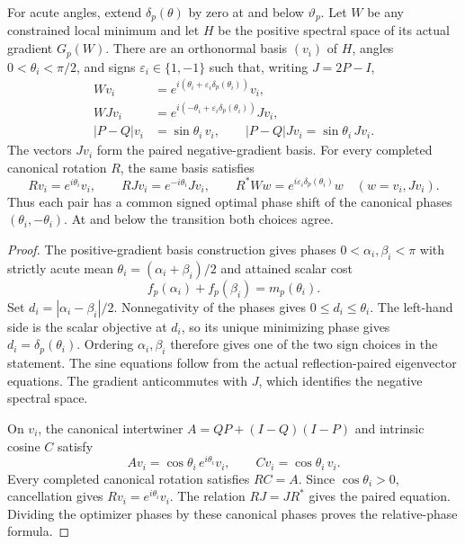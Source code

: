 \begin{proposition}
\label{prop:schatten-all-signed-phases}
For acute angles, extend $\delta_p(\theta)$ by zero at and below
$\vartheta_p$. Let $W$ be any constrained local minimum and let
$H$ be the positive spectral space of its actual gradient $G_p(W)$.
There are an orthonormal basis $(v_i)$ of $H$, angles
$0<\theta_i<\pi/2$, and signs $\varepsilon_i\in\{1,-1\}$ such that,
writing $J=2P-I$,
\[
\begin{aligned}
 Wv_i&=e^{i(\theta_i+\varepsilon_i\delta_p(\theta_i))}v_i,\\
 WJv_i&=e^{i(-\theta_i+\varepsilon_i\delta_p(\theta_i))}Jv_i,\\
 |P-Q|v_i&=\sin\theta_i\,v_i,\qquad
 |P-Q|Jv_i=\sin\theta_i\,Jv_i.
\end{aligned}
\]
The vectors $Jv_i$ form the paired negative-gradient basis.
For every completed canonical rotation $R$, the same basis satisfies
\[
 Rv_i=e^{i\theta_i}v_i,\qquad RJv_i=e^{-i\theta_i}Jv_i,
 \qquad
 R^*Ww=e^{i\varepsilon_i\delta_p(\theta_i)}w
 \quad(w=v_i,Jv_i).
\]
Thus each pair has a common signed optimal phase shift of the canonical
phases $(\theta_i,-\theta_i)$. At and below the transition both choices agree.
\end{proposition}

\begin{proof}
The positive-gradient basis construction gives phases
$0<\alpha_i,\beta_i<\pi$ with strictly acute mean
$\theta_i=(\alpha_i+\beta_i)/2$ and attained scalar cost
\[
 f_p(\alpha_i)+f_p(\beta_i)=m_p(\theta_i).
\]
Set $d_i=|\alpha_i-\beta_i|/2$. Nonnegativity of the phases gives
$0\leq d_i\leq\theta_i$. The left-hand side is the scalar objective
at $d_i$, so its unique minimizing phase gives
$d_i=\delta_p(\theta_i)$. Ordering $\alpha_i,\beta_i$ therefore gives
one of the two sign choices in the statement. The sine equations follow
from the actual reflection-paired eigenvector equations. The gradient
anticommutes with $J$, which identifies the negative spectral space.

On $v_i$, the canonical intertwiner $A=QP+(I-Q)(I-P)$ and intrinsic
cosine $C$ satisfy
\[
 Av_i=\cos\theta_i\,e^{i\theta_i}v_i,\qquad
 Cv_i=\cos\theta_i\,v_i.
\]
Every completed canonical rotation satisfies $RC=A$. Since
$\cos\theta_i>0$, cancellation gives $Rv_i=e^{i\theta_i}v_i$.
The relation $RJ=JR^*$ gives the paired equation. Dividing the optimizer
phases by these canonical phases proves the relative-phase formula.
\end{proof}

